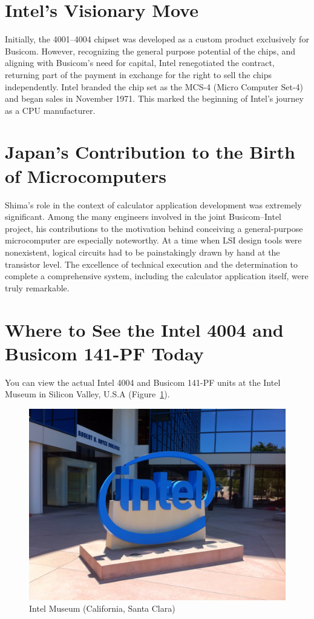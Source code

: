 \section{Intel’s Visionary Move}
Initially, the 4001–4004 chipset was developed as a custom product exclusively for Busicom. However, recognizing the general purpose potential of the chips, and aligning with Busicom’s need for capital, Intel renegotiated the contract, returning part of the payment in exchange for the right to sell the chips independently. Intel branded the chip set as the MCS-4 (Micro Computer Set-4) and began sales in November 1971. This marked the beginning of Intel's journey as a CPU manufacturer.

\section{Japan's Contribution to the Birth of Microcomputers}
Shima's role in the context of calculator application development was extremely significant. Among the many engineers involved in the joint Busicom–Intel project, his contributions to the motivation behind conceiving a general-purpose microcomputer are especially noteworthy. At a time when LSI design tools were nonexistent, logical circuits had to be painstakingly drawn by hand at the transistor level. The excellence of technical execution and the determination to complete a comprehensive system, including the calculator application itself, were truly remarkable.

\section{Where to See the Intel 4004 and Busicom 141-PF Today}
You can view the actual Intel 4004 and Busicom 141-PF units at the Intel Museum in Silicon Valley, U.S.A (Figure~\ref{fig:INTELMUSEUM}).

\begin{figure}
    \includegraphics[width=0.5\columnwidth]{./Figure/IntelMuseum.png}
    \caption{ Intel Museum (California, Santa Clara)\protect\footnotemark[5]}
    \label{fig:INTELMUSEUM}
\end{figure}

